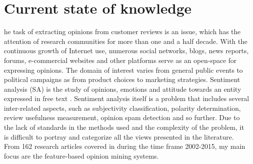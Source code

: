 %
%
\let\textcircled=\pgftextcircled
\chapter{Current state of knowledge}
\label{chap:02}

he task of extracting opinions from customer reviews is an issue, which has the attention of research communities for more than one and a half decade. With the continuous growth of Internet use, numerous social networks, blogs, news reports, forums, e-commercial websites and other platforms serve as an open-space for expressing opinions. The domain of interest varies from general public events to political campaigns as from product choices to marketing strategies. Sentiment analysis (SA) is the study of opinions, emotions and attitude towards an entity expressed in free text \cite{ravi2015survey}. Sentiment analysis itself is a problem that includes several inter-related aspects, such as subjectivity classification, polarity determination, review usefulness measurement, opinion spam detection and so further. Due to the lack of standards in the methods used and the complexity of the problem, it is difficult to portray and categorize all the views presented in the literature. From 162 research articles covered in \cite{ravi2015survey} during the time frame 2002-2015, my main focus are the feature-based opinion mining systems. 


